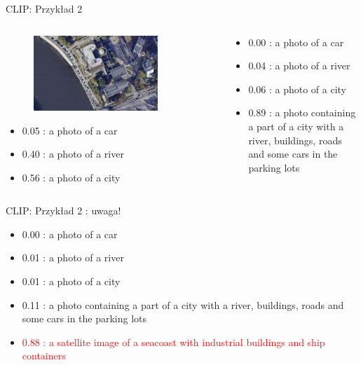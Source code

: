 \documentclass{beamer}
\begin{document}
\begin{frame}{CLIP: Przykład 2}
  \begin{columns}
    \begin{column}{0.5\textwidth}
      \begin{figure}
        \centering
        \includegraphics[width=0.8\textwidth]{../../img/satellite.png}
      \end{figure}
      \begin{itemize}
        \item 0.05 : a photo of a car
        \item 0.40 : a photo of a river
        \item 0.56 : a photo of a city
      \end{itemize}
    \end{column}
    \begin{column}{0.5\textwidth}
      \begin{itemize}
        \item 0.00 : a photo of a car
        \item 0.04 : a photo of a river
        \item 0.06 : a photo of a city
        \item 0.89 : a photo containing a part of a city with a river, buildings, roads and some cars in the parking lots
      \end{itemize}
    \end{column}
  \end{columns}
\end{frame}

\begin{frame}{CLIP: Przykład 2 : uwaga!}
  \begin{itemize}
    \item 0.00 : a photo of a car
    \item 0.01 : a photo of a river
    \item 0.01 : a photo of a city
    \item 0.11 : a photo containing a part of a city with a river, buildings, roads and some cars in the parking lots
    \item \textcolor{red}{0.88 : a satellite image of a seacoast with industrial buildings and ship containers}
  \end{itemize}
\end{frame}
\end{document}
